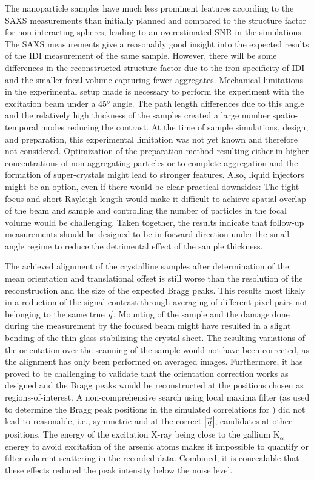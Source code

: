 The nanoparticle samples have much less prominent features according to the SAXS measurements than initially planned and compared to the structure factor for non-interacting spheres, leading to an overestimated SNR in the simulations. The SAXS measurements give a reasonably good insight into the expected results of the IDI measurement of the same sample. However, there will be some differences in the reconstructed structure factor due to the iron specificity of IDI and the smaller focal volume capturing fewer aggregates. Mechanical limitations in the experimental setup made is necessary to perform the experiment with the excitation beam under a 45° angle. The path length differences due to this angle and the relatively high thickness of the samples created a large number spatio-temporal modes reducing the contrast. At the time of sample simulations, design, and preparation, this experimental limitation was not yet known and therefore not considered.
Optimization of the preparation method resulting either in higher concentrations of non-aggregating particles or to complete aggregation and the formation of super-crystals might lead to stronger features. Also, liquid injectors might be an option, even if there would be clear practical downsides: The tight focus and short Rayleigh length would make it difficult to achieve spatial overlap of the beam and sample and controlling the number of particles in the focal volume would be challenging. Taken together, the results indicate that follow-up measurements should be designed to be in forward direction under the small-angle regime to reduce the detrimental effect of the sample thickness.

The achieved alignment of the crystalline samples after determination of the mean orientation and translational offset is still worse than the resolution of the reconstruction and the size of the expected Bragg peaks. This results most likely in a reduction of the signal contrast through averaging of different pixel pairs not belonging to the same true $\vec{q}$. Mounting of the sample and the damage done during the measurement by the focused beam might have resulted in a slight bending of the thin glass stabilizing the crystal sheet. The resulting variations of the orientation over the scanning of the sample would not have been corrected, as the alignment has only been performed on averaged images.  Furthermore, it has proved to be challenging to validate that the orientation correction works as designed and the Bragg peaks would be reconstructed at the positions chosen as regions-of-interest. A non-comprehensive search using local maxima filter (as used to determine the Bragg peak positions in the simulated correlations for ) did not lead to reasonable, i.e., symmetric and at the correct $\left|\vec{q}\right|$, candidates at other positions.
The energy of the excitation X-ray being close to the gallium K$_\alpha$ energy to avoid excitation of the arsenic atoms makes it impossible to quantify or filter coherent scattering in the recorded data. Combined, it is concealable that these effects reduced the peak intensity below the noise level. 

